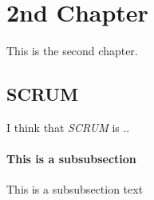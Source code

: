 \chapter{2nd Chapter}
\label{chapter:2ndchapter}

This is the second chapter.

\section{SCRUM}
I think that \emph{SCRUM} is ..

\subsubsection{This is a subsubsection}
This is a subsubsection text